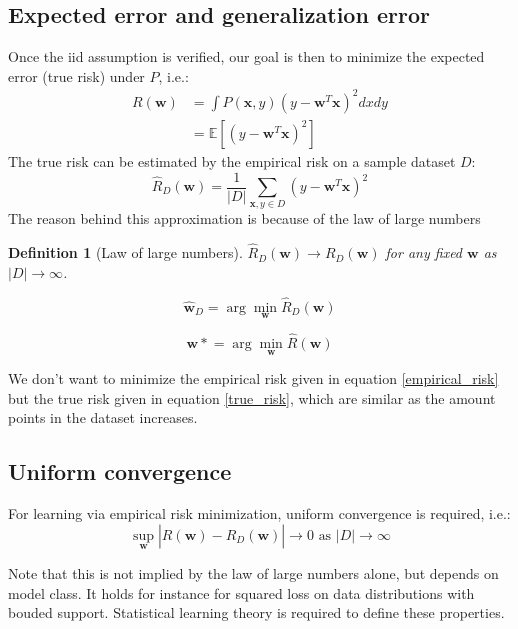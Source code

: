 \documentclass[a4paper,10pt,twoside]{article}
\newtheorem{definition}{Definition}[section]
\begin{document}
\subsection{Expected error and generalization error}
Once the iid assumption is verified, our goal is then to minimize the expected error (true risk) under $P$, i.e.:
\begin{align*}
    R(\mathbf{w})&=\int P(\mathbf{x},y)(y-\mathbf{w}^T\mathbf{x})^2dxdy\\
    & =\mathbb{E}[(y-\mathbf{w}^T\mathbf{x})^2]
\end{align*}
The true risk can be estimated by the empirical risk on a sample dataset $D$:
\begin{equation*}
    \hat{R}_D(\mathbf{w})=\frac{1}{|D|}\sum_{\mathbf{x}, y\in D}(y-\mathbf{w}^T\mathbf{x})^2
\end{equation*}
The reason behind this approximation is because of the law of large numbers
\begin{definition}[Law of large numbers]
    $\hat{R}_D(\mathbf{w})\rightarrow R_D(\mathbf{w})$ for any fixed $\mathbf{w}$ as $|D|\rightarrow\infty$.
\end{definition}
\begin{equation}
    \label{empirical_risk}
    \mathbf{\hat{w}}_D=\arg\min_{\mathbf{w}}\hat{R}_D(\mathbf{w})
\end{equation}

\begin{equation}
    \label{true_risk}
    \mathbf{w*}=\arg\min_{\mathbf{w}}\hat{R}(\mathbf{w})
\end{equation}

We don't want to minimize the empirical risk given in equation \ref{empirical_risk} but the true risk given in equation \ref{true_risk}, which are similar as the amount points in the dataset increases.

\subsection{Uniform convergence}

For learning via empirical risk minimization, uniform convergence is required, i.e.:
\begin{equation*}
    \sup_{\mathbf{w}}|R(\mathbf{w})-\hat{R}_D(\mathbf{w})|\rightarrow 0 \text{ as }|D|\rightarrow\infty
\end{equation*}

Note that this is not implied by the law of large numbers alone, but depends on model class. It holds for instance for squared loss on data distributions with bouded support. Statistical learning theory is required to define these properties.
\end{document}
